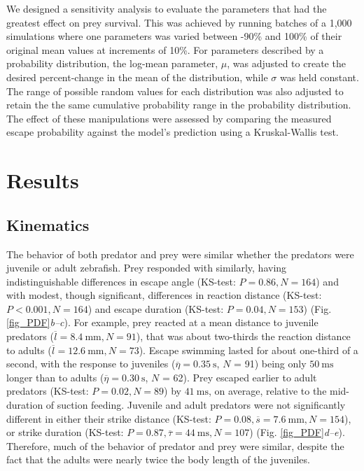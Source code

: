 \documentclass[]{rsos}%
\begin{document}
We designed a sensitivity analysis to evaluate the parameters that had the greatest effect on prey survival. 
This was achieved by running batches of a 1,000 simulations where one parameters was varied between -90\% and 100\% of their original mean values at increments of 10\%.
For parameters described by a probability distribution, the log-mean parameter, $\mu$, was adjusted to create the desired percent-change in the mean of the distribution, while $\sigma$ was held constant.
The range of possible random values for each distribution was also adjusted to retain the the same cumulative probability range in the probability distribution.
The effect of these manipulations were assessed by comparing the measured escape probability against the model's prediction using a Kruskal-Wallis test. 


\section{Results} %

\subsection{Kinematics} %
The behavior of both predator and prey were similar whether the predators were juvenile or adult zebrafish.
Prey responded with similarly, having indistinguishable differences in escape angle (KS-test: $P = 0.86, N = 164$) and with modest, though significant, differences in reaction distance (KS-test: $P < 0.001, N = 164$) and escape duration (KS-test: $P = 0.04, N = 153$) (Fig. \ref{fig_PDF}\textit{b--c}). 
For example, prey reacted at a mean distance to juvenile predators ($\overline{l} = \SI{8.4}{\mm}, N = 91$), that was about two-thirds the reaction distance to adults ($\overline{l} = \SI{12.6}{\mm}, N = 73$).
Escape swimming lasted for about one-third of a second, with the response to juveniles ($\overline{\eta} = \SI{0.35}{\s}$, $N$ = 91) being only  $\SI{50}{\ms}$ longer than to adults ($\overline{\eta} = \SI{0.30}{\s}$, $N$ = 62).
Prey escaped earlier to adult predators (KS-test: $P = 0.02, N = 89$) by $\SI{41}{\ms}$, on average, relative to the mid-duration of suction feeding.
Juvenile and adult predators were not significantly different in either their strike distance (KS-test: $P = 0.08, \overline{s} = \SI{7.6}{\mm}, N = 154$), or strike duration (KS-test: $P = 0.87, \overline{\tau} = \SI{44}{\ms}, N = 107$) (Fig. \ref{fig_PDF}\textit{d--e}).
Therefore, much of the behavior of predator and prey were similar, despite the fact that the adults were nearly twice the body length of the juveniles.
\end{document}
